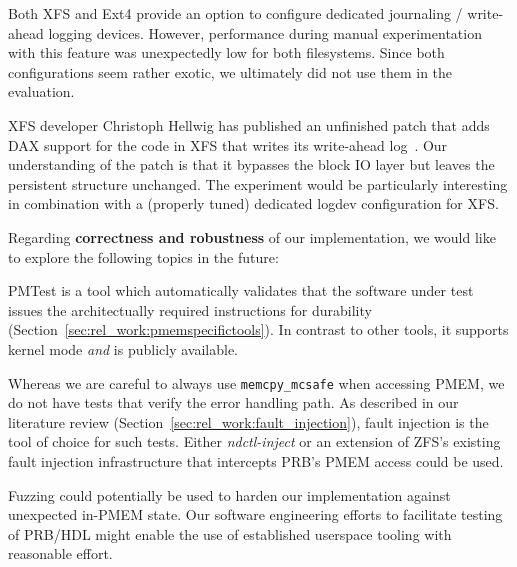\documentclass[12pt,a4paper,twoside]{book}
\begin{document}
{\begin{description}[noitemsep,leftmargin=1.5cm,labelindent=1cm]
    \item[Ext4 journal\_dev / XFS logdev] Both XFS and Ext4 provide an option to configure dedicated journaling / write-ahead logging devices.
        However, performance during manual experimentation with this feature was unexpectedly low for both filesystems.
        Since both configurations seem rather exotic, we ultimately did not use them in the evaluation.

    \item[XFS DAX Log Patch] XFS developer Christoph Hellwig has published an unfinished patch that adds DAX support for the code in XFS that writes its write-ahead log~\cite{LKMLChristophHellwig}.
        Our understanding of the patch is that it bypasses the block IO layer but leaves the persistent structure unchanged.
        The experiment would be particularly interesting in combination with a (properly tuned) dedicated logdev configuration for XFS.
\end{description}

\begin{samepage}
Regarding \textbf{correctness and robustness} of our implementation, we would like to explore the following topics in the future:
\begin{description}[noitemsep,leftmargin=1.5cm,labelindent=1cm]
    \item[Validating PMEM Durability] PMTest is a tool which automatically validates that the software under test issues the architectually required instructions for durability (Section~\ref{sec:rel_work:pmemspecifictools}).
        In contrast to other tools, it supports kernel mode \textit{and} is publicly available.

    \item[Fault Injection for PMEM Access] Whereas we are careful to always use \lstinline{memcpy_mcsafe} when accessing PMEM, we do not have tests that verify the error handling path.
        As described in our literature review (Section~\ref{sec:rel_work:fault_injection}), fault injection is the tool of choice for such tests.
        Either \textit{ndctl-inject} or an extension of ZFS's existing fault injection infrastructure that intercepts PRB's PMEM access could be used.

    \item[Fuzzing] Fuzzing could potentially be used to harden our implementation against unexpected in-PMEM state.
        Our software engineering efforts to facilitate testing of PRB/HDL might enable the use of established userspace tooling with reasonable effort.
\end{description}
\end{samepage}

}
\end{document}
